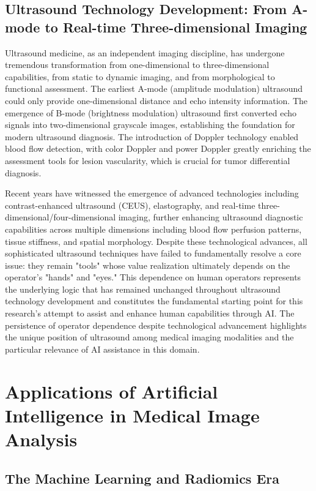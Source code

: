 \subsection{Ultrasound Technology Development: From A-mode to Real-time Three-dimensional Imaging}

Ultrasound medicine, as an independent imaging discipline, has undergone tremendous transformation from one-dimensional to three-dimensional capabilities, from static to dynamic imaging, and from morphological to functional assessment. The earliest A-mode (amplitude modulation) ultrasound could only provide one-dimensional distance and echo intensity information. The emergence of B-mode (brightness modulation) ultrasound first converted echo signals into two-dimensional grayscale images, establishing the foundation for modern ultrasound diagnosis. The introduction of Doppler technology enabled blood flow detection, with color Doppler and power Doppler greatly enriching the assessment tools for lesion vascularity, which is crucial for tumor differential diagnosis.

Recent years have witnessed the emergence of advanced technologies including contrast-enhanced ultrasound (CEUS), elastography, and real-time three-dimensional/four-dimensional imaging, further enhancing ultrasound diagnostic capabilities across multiple dimensions including blood flow perfusion patterns, tissue stiffness, and spatial morphology. Despite these technological advances, all sophisticated ultrasound techniques have failed to fundamentally resolve a core issue: they remain "tools" whose value realization ultimately depends on the operator's "hands" and "eyes." This dependence on human operators represents the underlying logic that has remained unchanged throughout ultrasound technology development and constitutes the fundamental starting point for this research's attempt to assist and enhance human capabilities through AI. The persistence of operator dependence despite technological advancement highlights the unique position of ultrasound among medical imaging modalities and the particular relevance of AI assistance in this domain.

\section{Applications of Artificial Intelligence in Medical Image Analysis}

\subsection{The Machine Learning and Radiomics Era}

